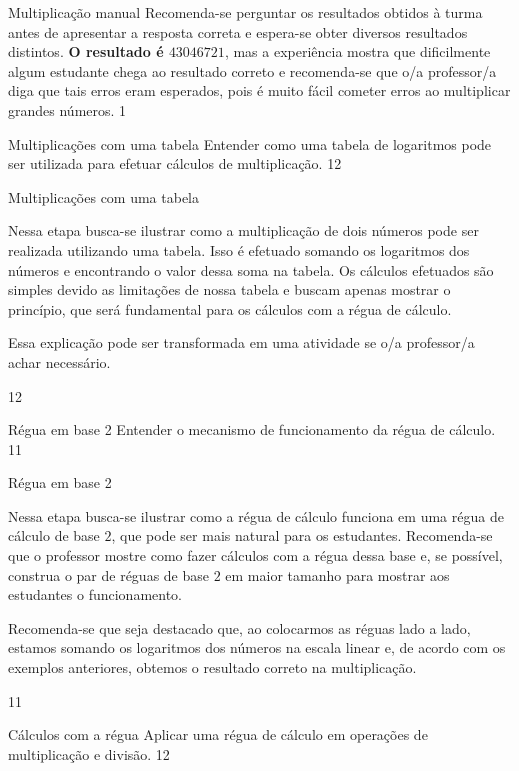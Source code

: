 \marginpar{\vspace{.5em}}
\begin{answer}{Multiplicação manual}
{
	Recomenda-se perguntar os resultados obtidos à turma antes de apresentar a resposta correta e espera-se obter diversos resultados distintos. \textbf{O resultado é $43046721$}, mas a experiência mostra que dificilmente algum estudante chega ao resultado correto e recomenda-se que o/a professor/a diga que tais erros eram esperados, pois é muito fácil cometer erros ao multiplicar grandes números.
}{1}
\end{answer}
\clearmargin
\begin{objectives}{Multiplicações com uma tabela}
{
	Entender como uma tabela de logaritmos pode ser utilizada para efetuar cálculos de multiplicação.
}{1}{2}
\end{objectives}
\begin{sugestions}{Multiplicações com uma tabela}
{
	Nessa etapa busca-se ilustrar como a multiplicação de dois números pode ser realizada utilizando uma tabela. Isso é efetuado somando os logaritmos dos números e encontrando o valor dessa soma na tabela. Os cálculos efetuados são simples devido as limitações de nossa tabela e buscam apenas mostrar o princípio, que será fundamental para os cálculos com a régua de cálculo.

	Essa explicação pode ser transformada em uma atividade se o/a professor/a achar necessário.
}{1}{2}
\end{sugestions}
\clearmargin
\begin{objectives}{Régua em base 2}
{
	Entender o mecanismo de funcionamento da régua de cálculo.
}{1}{1}
\end{objectives}
\begin{sugestions}{Régua em base 2}
{
	Nessa etapa busca-se ilustrar como a régua de cálculo funciona em uma régua de cálculo de base $2$, que pode ser mais natural para os estudantes. Recomenda-se que o professor mostre como fazer cálculos com a régua dessa base e, se possível, construa o par de réguas de base $2$ em maior tamanho para mostrar aos estudantes o funcionamento.

	Recomenda-se que seja destacado que, ao colocarmos as réguas lado a lado, estamos somando os logaritmos dos números na escala linear e, de acordo com os exemplos anteriores, obtemos o resultado correto na multiplicação.
}{1}{1}
\end{sugestions}
\clearmargin
\begin{objectives}{Cálculos com a régua}
{
	Aplicar uma régua de cálculo em operações de multiplicação e divisão.
}{1}{2}
\end{objectives}
